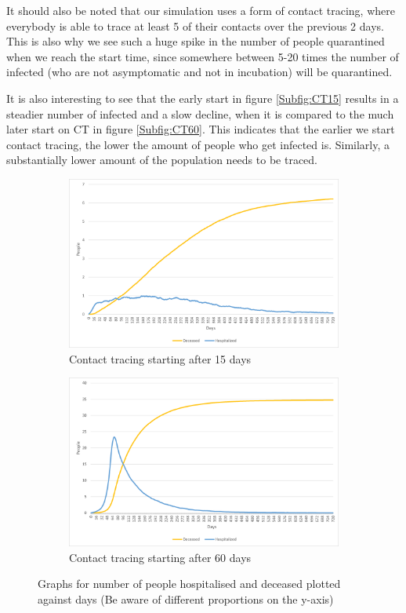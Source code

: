 It should also be noted that our simulation uses a  form of contact tracing, where everybody is able to trace at least 5 of their contacts over the previous 2 days. This is also why we see such a huge spike in the number of people quarantined when we reach the start time, since somewhere between 5-20 times the number of infected (who are not asymptomatic and not in incubation) will be quarantined.

It is also interesting to see that the early start in figure \ref{Subfig:CT15} results in a steadier number of infected and a slow decline, when it is compared to the much later start on CT in figure \ref{Subfig:CT60}. This indicates that the earlier we start contact tracing, the lower the amount of people who get infected is. Similarly, a substantially lower amount of the population needs to be traced.

\begin{figure}[H]
\centering
\begin{subfigure}{.5\textwidth}
  \centering
  \includegraphics[width=.95\linewidth]{0_billeder/CT15DaysDH.png}
  \caption{Contact tracing starting after 15 days}
  \label{Subfig:CT15DH}
\end{subfigure}%
\begin{subfigure}{.5\textwidth}
  \centering
  \includegraphics[width=.95\linewidth]{0_billeder/CT60DaysDH.png}
  \caption{Contact tracing starting after 60 days}
  \label{Subfig:CT60DH}
\end{subfigure}
\caption{Graphs for number of people hospitalised and deceased plotted against days (Be aware of different proportions on the y-axis)}
\label{fig:CTstart2}
\end{figure}

